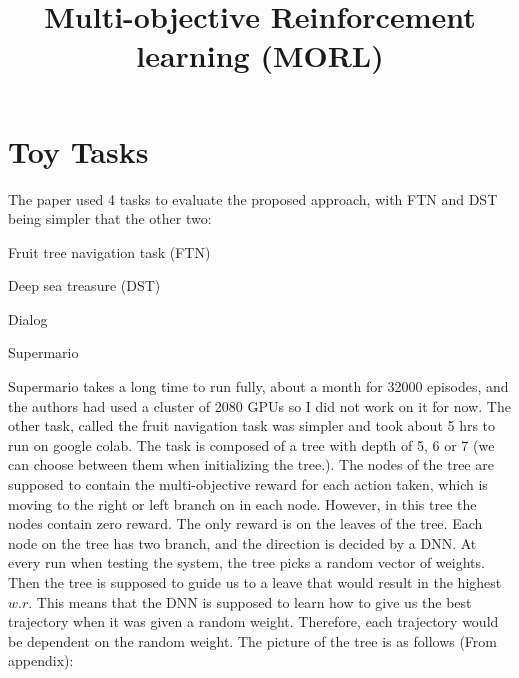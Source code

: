 \documentclass[11pt,onecolumn]{IEEEtran}
\begin{document}
%
%
%          
%
%   
% 
    

\title{Multi-objective Reinforcement learning (MORL)}


\maketitle
\section*{\centering\textbf{Toy Tasks}}
The paper used 4 tasks to evaluate the proposed approach, with FTN and DST being simpler that the other two:

\begin{itemize}{
\item Fruit tree navigation task (FTN)
\item Deep sea treasure (DST)
\item Dialog
\item Supermario
}\end{itemize}


Supermario takes a long time to run fully, about a month for 32000 episodes, and the authors had used a cluster of 2080 GPUs so I did not work on it for now. The other task, called the fruit navigation task was simpler and took about 5 hrs to run on google colab. The task is composed of a tree with depth of 5, 6 or 7 (we can choose between them when initializing the tree.). The nodes of the tree are supposed to contain the multi-objective reward for each action taken, which is moving to the right or left branch on in each node. However, in this tree the nodes contain zero reward. The only reward is on the leaves of the tree. Each node on the tree has two branch, and the direction is decided by a DNN. At every run when testing the system, the tree picks a random vector of weights. Then the tree is supposed to guide us to a leave that would result in the highest $w.r$. This means that the DNN is supposed to learn how to give us the best trajectory when it was given a random weight. Therefore, each trajectory would be dependent on the random weight. 
The picture of the tree is as follows (From \cite{yang2019generalized} appendix):
\end{document}
